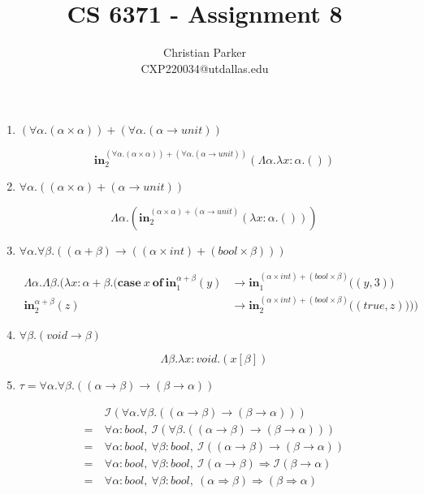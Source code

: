 \documentclass{article}
\title{CS 6371 - Assignment 8}
\author{Christian Parker \\ CXP220034@utdallas.edu}
\begin{document}
\maketitle
\begin{enumerate}
    \item %
    \((\forall \alpha. (\alpha \times \alpha)) + (\forall \alpha. (\alpha \to unit))\)

    \[\textbf{in}_2^{(\forall \alpha.(\alpha \times \alpha)) + (\forall \alpha.(\alpha \to unit))}(\Lambda \alpha. \lambda x{:} \alpha. ())\]

    \item %
    \(\forall \alpha. ((\alpha \times \alpha) + (\alpha \to unit))\)

    \[\Lambda \alpha. (\textbf{in}_2^{(\alpha \times \alpha) + (\alpha \to unit)}(\lambda x{:} \alpha. ()))\]

    \item %
    \(\forall \alpha. \forall \beta. ((\alpha + \beta) \to ((\alpha \times int) + (bool \times \beta)))\)

    \begin{align*}
        \Lambda \alpha. \Lambda \beta. \Bigg( \lambda x{:} \alpha + \beta. \Big( \textbf{case}\ x\ \textbf{of}\
        \textbf{in}_1^{\alpha + \beta} (y) &\to \textbf{in}_1^{(\alpha \times int) + (bool \times \beta)}\big((y, 3)\big) \\
        \textbf{in}_2^{\alpha + \beta} (z) &\to \textbf{in}_2^{(\alpha \times int) + (bool \times \beta)}\big((true, z)\big) \Big) \Bigg) &
    \end{align*}

    \item %
    \(\forall \beta. (void \to \beta)\)

    \[\Lambda \beta. \lambda x {:} void. (x[\beta])\]

    \item %
    \(\tau = \forall \alpha. \forall \beta. ((\alpha \to \beta) \to (\beta \to \alpha))\)

    \begin{align*}
        & \mathcal{I}(\forall \alpha. \forall \beta. ((\alpha \to \beta) \to (\beta \to \alpha))) \\
        =\ & \forall \alpha {:} bool,\ \mathcal{I}(\forall \beta. ((\alpha \to \beta) \to (\beta \to \alpha))) \\
        =\ & \forall \alpha {:} bool,\ \forall \beta {:} bool,\ \mathcal{I}((\alpha \to \beta) \to (\beta \to \alpha)) \\
        =\ & \forall \alpha {:} bool,\ \forall \beta {:} bool,\ \mathcal{I}(\alpha \to \beta) \Rightarrow \mathcal{I}(\beta \to \alpha) \\
        =\ & \forall \alpha {:} bool,\ \forall \beta {:} bool,\ (\alpha \Rightarrow \beta) \Rightarrow (\beta \Rightarrow \alpha) \\
    \end{align*}


\end{enumerate}
\end{document}
